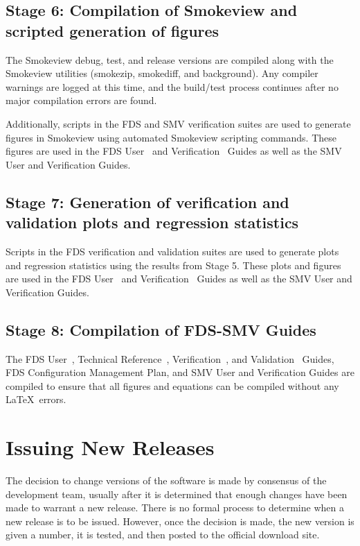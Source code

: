 \documentclass[11pt]{book}
\begin{document}
\subsection*{Stage 6: Compilation of Smokeview and scripted generation of figures}

The Smokeview debug, test, and release versions are compiled along with the Smokeview utilities (smokezip, smokediff, and background). Any compiler warnings are logged at this time, and the build/test process continues after no major compilation errors are found.

Additionally, scripts in the FDS and SMV verification suites are used to generate figures in Smokeview using automated Smokeview scripting commands. These figures are used in the FDS User~\cite{FDS_Users_Guide} and Verification~\cite{FDS_Verification_Guide} Guides as well as the SMV User and Verification Guides.

\subsection*{Stage 7: Generation of verification and validation plots and regression statistics}

Scripts in the FDS verification and validation suites are used to generate plots and regression statistics using the results from Stage 5. These plots and figures are used in the FDS User~\cite{FDS_Users_Guide} and Verification~\cite{FDS_Verification_Guide} Guides as well as the SMV User and Verification Guides.

\subsection*{Stage 8: Compilation of FDS-SMV Guides}

The FDS User~\cite{FDS_Users_Guide}, Technical Reference~\cite{FDS_Math_Guide}, Verification~\cite{FDS_Verification_Guide}, and Validation~\cite{FDS_Validation_Guide} Guides, FDS Configuration Management Plan, and SMV User and Verification Guides are compiled to ensure that all figures and equations can be compiled without any \LaTeX\ errors.

\clearpage

\section{Issuing New Releases}

The decision to change versions of the software is made by consensus of the development team, usually after it is determined that enough
changes have been made to warrant a new release. There is no formal process to determine when a new release is to be issued. However, once the
decision is made, the new version is given a number, it is tested, and then posted to the official download site.
\end{document}
